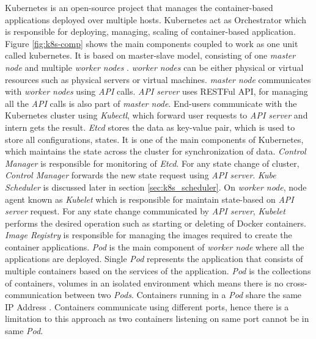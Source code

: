 Kubernetes is an open-source project that manages the container-based applications deployed over multiple hosts. Kubernetes act as Orchestrator which is responsible for deploying, managing, scaling of container-based application\cite{kubernetes-github-repo}. Figure \ref{fig:k8s-comp} shows the main components coupled to work as one unit called kubernetes. It is based on master-slave model, consisting of one \emph{master node} and multiple \emph{worker nodes} \cite{Santos2019}. \emph{worker nodes} can be either physical or virtual resources such as physical servers or virtual machines. \emph{master node} communicates with \emph{worker nodes} using \emph{API} calls. \emph{API server} uses RESTFul API, for managing all the \emph{API} calls is also part of \emph{master node}. End-users communicate with the Kubernetes cluster using \emph{Kubectl}, which forward user requests to \emph{API server} and intern gets the result. \emph{Etcd} stores the data as key-value pair, which is used to store all configurations, states. It is one of the main components of Kubernetes, which maintains the state across the cluster for synchronization of data. \emph{Control Manager} is responsible for monitoring of \emph{Etcd}. For any state change of cluster, \emph{Control Manager} forwards the new state request using \emph{API server}. \emph{Kube Scheduler} is discussed later in section \ref{sec:k8s_scheduler}. On \emph{worker node}, node agent known as \emph{Kubelet} which is responsible for maintain state-based on \emph{API server} request. For any state change communicated by \emph{API server}, \emph{Kubelet} performs the desired operation such as starting or deleting of Docker containers. \emph{Image Registry} is responsible for managing the images required to create the container applications. \emph{Pod} is the main component of \emph{worker node} where all the applications are deployed. Single \emph{Pod} represents the application that consists of multiple containers based on the services of the application. \emph{Pod} is the collections of containers, volumes in an isolated environment which means there is no cross-communication between two \emph{Pods}. Containers running in a \emph{Pod} share the same IP Address \cite{Santos2019}. Containers communicate using different ports, hence there is a limitation to this approach as two containers listening on same port cannot be in same \emph{Pod}\cite{Santos2019}.
